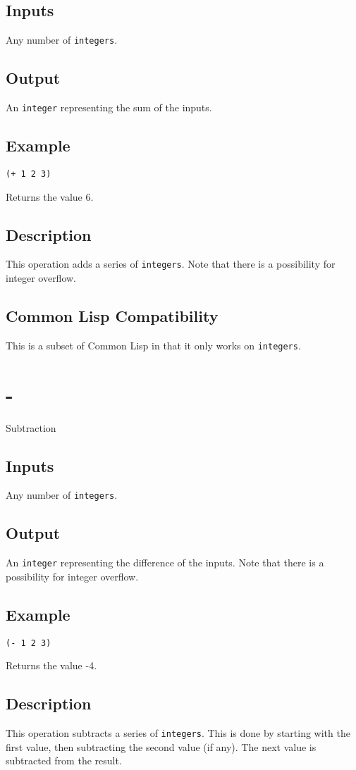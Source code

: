 \documentclass[10pt, openany]{book}
\newcommand{\datatype}[1]{\texttt{#1}}
\newcommand{\cl}{Common Lisp}
\begin{document}
\subsection{Inputs}
Any number of \datatype{integers}.
\subsection{Output}
An \datatype{integer} representing the sum of the inputs.
\subsection{Example}
\begin{lstlisting}
(+ 1 2 3)
\end{lstlisting}
Returns the value 6.
\subsection{Description}
This operation adds a series of \datatype{integers}.  Note that there is a possibility for integer overflow.
\subsection{Common Lisp Compatibility}
This is a subset of \cl{} in that it only works on \datatype{integers}.

\section{-}
Subtraction
\subsection{Inputs}
Any number of \datatype{integers}.
\subsection{Output}
An \datatype{integer} representing the difference of the inputs.  Note that there is a possibility for integer overflow.
\subsection{Example}
\begin{lstlisting}
(- 1 2 3)
\end{lstlisting}
Returns the value -4.
\subsection{Description}
This operation subtracts a series of \datatype{integers}.  This is done by starting with the first value, then subtracting the second value (if any).  The next value is subtracted from the result.
\end{document}
